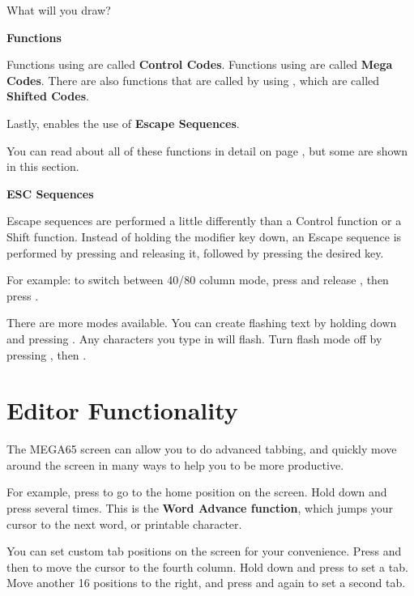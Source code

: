 What will you draw?

\needspace{2cm}
\textbf{Functions}

Functions using  are called \textbf{Control Codes}.
Functions using \megasymbolkey are called \textbf{Mega Codes}. There are also functions that are called by using , which
are called \textbf{Shifted Codes}.

Lastly,  enables the use of \textbf{Escape Sequences}.

You can read about all of these functions in detail on page \pageref{appendix:controlcodes}, but some are shown in this section.

\needspace{2cm}
\textbf{ESC Sequences}

Escape sequences are performed a little differently than a Control function or a Shift function. Instead of holding the modifier key down, an Escape sequence is performed by pressing  and releasing it, followed by pressing the desired key.

For example: to switch between 40/80 column mode, press and release , then press .

There are more modes available. You can create flashing text by holding  down and pressing . Any characters you type in will flash. Turn flash mode off by pressing ,  then .



\section{Editor Functionality}


The MEGA65 screen can allow you to do advanced tabbing, and quickly move around the screen in many ways to help you to be more productive.

For example, press  to go to the home position on the screen. Hold  down and press  several times. This is the \textbf{Word Advance function}, which jumps your cursor to the next word, or printable character.

You can set custom tab positions on the screen for your convenience. Press  and then \megakey{$\rightarrow$} to move the cursor to the fourth column. Hold down  and press  to set a tab. Move another 16 positions to the right, and press  and  again to set a second tab.

